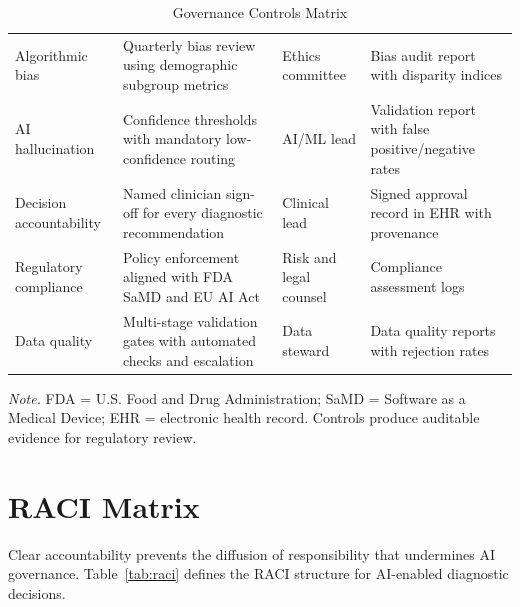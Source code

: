\begin{table}[H]
\tablestripes
\begin{tabularx}{\textwidth}{L L L L}
\toprule
{} &  &  &  \\
\midrule
Algorithmic bias & Quarterly bias review using demographic subgroup metrics & Ethics committee & Bias audit report with disparity indices \\
\addlinespace
AI hallucination & Confidence thresholds with mandatory low-confidence routing & AI/ML lead & Validation report with false positive/negative rates \\
\addlinespace
Decision accountability & Named clinician sign-off for every diagnostic recommendation & Clinical lead & Signed approval record in EHR with provenance \\
\addlinespace
Regulatory compliance & Policy enforcement aligned with FDA SaMD and EU AI Act & Risk and legal counsel & Compliance assessment logs \\
\addlinespace
Data quality & Multi-stage validation gates with automated checks and escalation & Data steward & Data quality reports with rejection rates \\
\bottomrule
\end{tabularx}
\caption{Governance Controls Matrix}
\label{tab:governance_controls}
\vspace{0.5em}\noindent\textit{Note.} FDA = U.S. Food and Drug Administration; SaMD = Software as a Medical Device; EHR = electronic health record. Controls produce auditable evidence for regulatory review.
\end{table}

\section{RACI Matrix}
\label{sec:fw_raci}

Clear accountability prevents the diffusion of responsibility that undermines AI governance. Table~\ref{tab:raci} defines the RACI structure for AI-enabled diagnostic decisions.

